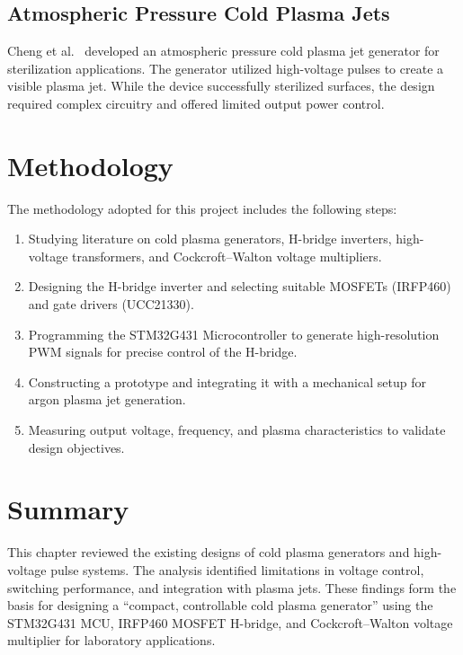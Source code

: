 \subsection{Atmospheric Pressure Cold Plasma Jets}\label{sec-rev-topic13}

Cheng et al.~\cite{Cheng2006} developed an atmospheric pressure cold plasma jet generator for sterilization applications. The generator utilized high-voltage pulses to create a visible plasma jet. While the device successfully sterilized surfaces, the design required complex circuitry and offered limited output power control.




\section{Methodology}\label{sec-rm}

The methodology adopted for this project includes the following steps:  
\begin{enumerate}
    \item Studying literature on cold plasma generators, H-bridge inverters, high-voltage transformers, and Cockcroft--Walton voltage multipliers.
    \item Designing the H-bridge inverter and selecting suitable MOSFETs (IRFP460) and gate drivers (UCC21330).
    \item Programming the STM32G431 Microcontroller to generate high-resolution PWM signals for precise control of the H-bridge.
    \item Constructing a prototype and integrating it with a mechanical setup for argon plasma jet generation.
    \item Measuring output voltage, frequency, and plasma characteristics to validate design objectives.
\end{enumerate}

\section{Summary}

This chapter reviewed the existing designs of cold plasma generators and high-voltage pulse systems. The analysis identified limitations in voltage control, switching performance, and integration with plasma jets. These findings form the basis for designing a ``compact, controllable cold plasma generator'' using the STM32G431 MCU, IRFP460 MOSFET H-bridge, and Cockcroft--Walton voltage multiplier for laboratory applications.

\nocite{Diaz2022, Spassov1997, Cheng2006}
